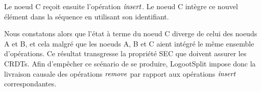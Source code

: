 Le noeud C reçoit ensuite l'opération $\mathit{insert}$.
Le noeud C intègre ce nouvel élément dans la séquence en utilisant son identifiant.

Nous constatons alors que l'état à terme du noeud C diverge de celui des noeuds A et B, et cela malgré que les noeuds A, B et C aient intégré le même ensemble d'opérations.
Ce résultat transgresse la propriété \ac{SEC} \cite{shapiro_2011_crdt} que doivent assurer les \acp{CRDT}.
Afin d'empêcher ce scénario de se produire, LogootSplit impose donc la livraison causale des opérations $\mathit{remove}$ par rapport aux opérations $\mathit{insert}$ correspondantes.
